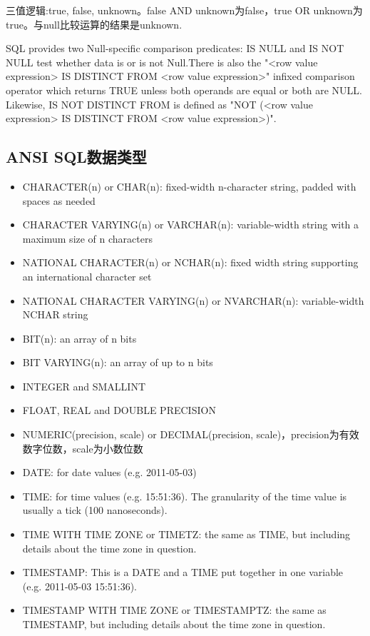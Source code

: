 三值逻辑:true, false, unknown。false AND unknown为false，true OR unknown为true。与null比较运算的结果是unknown.

SQL provides two Null-specific comparison predicates: IS NULL and IS NOT NULL test whether data is or is not Null.There is also the "<row value expression> IS DISTINCT FROM <row value expression>" infixed comparison operator which returns TRUE unless both operands are equal or both are NULL. Likewise, IS NOT DISTINCT FROM is defined as "NOT (<row value expression> IS DISTINCT FROM <row value expression>)".


\subsection{ANSI SQL数据类型}
\begin{itemize}
   \item 
 CHARACTER(n) or CHAR(n): fixed-width n-character string, padded with spaces as needed
   \item 
CHARACTER VARYING(n) or VARCHAR(n): variable-width string with a maximum size of n characters
   \item 
NATIONAL CHARACTER(n) or NCHAR(n): fixed width string supporting an international character set
   \item 
NATIONAL CHARACTER VARYING(n) or NVARCHAR(n): variable-width NCHAR string
   \item 
BIT(n): an array of n bits
   \item 
BIT VARYING(n): an array of up to n bits
   \item 
INTEGER and SMALLINT
   \item 
FLOAT, REAL and DOUBLE PRECISION
   \item 
NUMERIC(precision, scale) or DECIMAL(precision, scale)，precision为有效数字位数，scale为小数位数
   \item 
DATE: for date values (e.g. 2011-05-03)
   \item 
TIME: for time values (e.g. 15:51:36). The granularity of the time value is usually a tick (100 nanoseconds).
   \item 
TIME WITH TIME ZONE or TIMETZ: the same as TIME, but including details about the time zone in question.
   \item 
TIMESTAMP: This is a DATE and a TIME put together in one variable (e.g. 2011-05-03 15:51:36).
   \item 
TIMESTAMP WITH TIME ZONE or TIMESTAMPTZ: the same as TIMESTAMP, but including details about the time zone in question.
\end{itemize}





